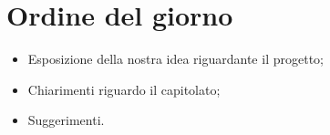 \documentclass[../Riunione2015-12-21.tex]{subfiles}
\begin{document}
\section{Ordine del giorno}
\begin{itemize}
	\item Esposizione della nostra idea riguardante il progetto;
	\item Chiarimenti riguardo il capitolato;
	\item Suggerimenti.
\end{itemize}
\end{document}
